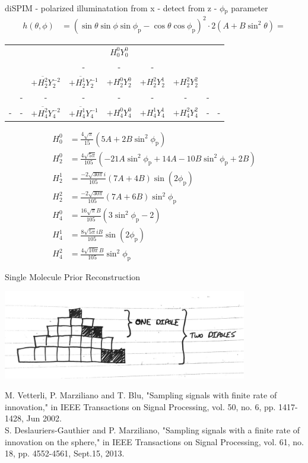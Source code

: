 \documentclass[presentation]{beamer}
\begin{document}
\begin{frame}[label=sec-10]{diSPIM - polarized illuminatation from x - detect from z - $\phi$$_{\text{p}}$ parameter}
\small
\begin{align*}
h(\theta, \phi) &= (\sin\theta\sin\phi\sin\phi_{\text{p}} - \cos\theta\cos\phi_{\text{p}})^2\cdot2(A + B\sin^2\theta) = 
\end{align*}
\tiny
\begin{center}
\begin{tabular}{ccccccccc} 
&&&&$H_0^0Y_0^0$&&&&\\
&&&-&-&-&&&\\
&&$+\overline{H_2^2}Y_2^{-2}$&$+\overline{H_2^1}Y_2^{-1}$&+$H_2^0Y_2^0$&+$H_2^2Y_2^{1}$&+$H_2^2Y_2^{2}$&&\\
&-&-&-&-&-&-&-&\\
-&-&$+\overline{H_4^2}Y_4^{-2}$&$+\overline{H_4^1}Y_4^{-1}$&$+H_4^0Y_4^0$&$+H_4^1Y_4^1$&$+H_4^2Y_4^2$&-&-\\
\end{tabular}
\end{center}
\begin{align*}
H_0^0 &= \frac{4\sqrt{\pi}}{15}(5A + 2B\sin^2\phi_{\text{p}})\\
H_2^0 &= \frac{4\sqrt{5\pi}}{105}(-21A\sin^2\phi_\text{p} + 14A - 10B\sin^2\phi_{\text{p}} + 2B)\\
H_2^1 &= \frac{-2\sqrt{30\pi}i}{105}(7A+4B)\sin(2\phi_{\text{p}})\\
H_2^2 &= \frac{-2\sqrt{30\pi}}{105}(7A+6B)\sin^2\phi_{\text{p}}\\
H_4^0 &= \frac{16\sqrt{\pi}B}{105}(3\sin^2\phi_{\text{p}} - 2)\\
H_4^1 &= \frac{8\sqrt{5\pi}iB}{105}\sin(2\phi_{\text{p}})\\
H_4^2 &= \frac{4\sqrt{10\pi}B}{105}\sin^2\phi_{\text{p}}
\end{align*}
\end{frame}
\begin{frame}[label=sec-11]{Single Molecule Prior Reconstruction}
\begin{center}
  \includegraphics[width=0.8\textwidth, interpolate=true]{figs/minsamp}
\end{center}
M. Vetterli, P. Marziliano and T. Blu, "Sampling signals with finite rate of innovation," in IEEE Transactions on Signal Processing, vol. 50, no. 6, pp. 1417-1428, Jun 2002.\\
S. Deslauriers-Gauthier and P. Marziliano, "Sampling signals with a finite rate of innovation on the sphere," in IEEE Transactions on Signal Processing, vol. 61, no. 18, pp. 4552-4561, Sept.15, 2013.
\end{frame}
\end{document}
